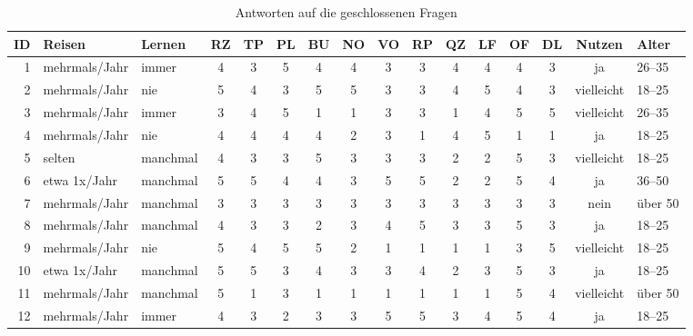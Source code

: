 \documentclass[12pt,a4paper]{scrreprt}
\begin{document}
\begin{table}[!htb]
    \centering
    \footnotesize
    \setlength{\tabcolsep}{3.5pt}
    \begin{tabular}{rllccccccccccccl}
        \toprule
        ID & Reisen & Lernen & RZ & TP & PL & BU & NO & VO & RP & QZ & LF & OF & DL & Nutzen & Alter \\
        \midrule
        1 & mehrmals/Jahr & immer & 4 & 3 & 5 & 4 & 4 & 3 & 3 & 4 & 4 & 4 & 3 & ja & 26--35 \\
        2 & mehrmals/Jahr & nie & 5 & 4 & 3 & 5 & 5 & 3 & 3 & 4 & 5 & 4 & 3 & vielleicht & 18--25 \\
        3 & mehrmals/Jahr & immer & 3 & 4 & 5 & 1 & 1 & 3 & 3 & 1 & 4 & 5 & 5 & vielleicht & 26--35 \\
        4 & mehrmals/Jahr & nie & 4 & 4 & 4 & 4 & 2 & 3 & 1 & 4 & 5 & 1 & 1 & ja & 18--25 \\
        5 & selten & manchmal & 4 & 3 & 3 & 5 & 3 & 3 & 3 & 2 & 2 & 5 & 3 & vielleicht & 18--25 \\
        6 & etwa 1x/Jahr & manchmal & 5 & 5 & 4 & 4 & 3 & 5 & 5 & 2 & 2 & 5 & 4 & ja & 36--50 \\
        7 & mehrmals/Jahr & manchmal & 3 & 3 & 3 & 3 & 3 & 3 & 3 & 3 & 3 & 3 & 3 & nein & über 50 \\
        8 & mehrmals/Jahr & manchmal & 4 & 3 & 3 & 2 & 3 & 4 & 5 & 3 & 3 & 5 & 3 & ja & 18--25 \\
        9 & mehrmals/Jahr & nie & 5 & 4 & 5 & 5 & 2 & 1 & 1 & 1 & 1 & 3 & 5 & vielleicht & 18--25 \\
        10 & etwa 1x/Jahr & manchmal & 5 & 5 & 3 & 4 & 3 & 3 & 4 & 2 & 3 & 5 & 3 & ja & 18--25 \\
        11 & mehrmals/Jahr & manchmal & 5 & 1 & 3 & 1 & 1 & 1 & 1 & 1 & 1 & 5 & 4 & vielleicht & über 50 \\
        12 & mehrmals/Jahr & immer & 4 & 3 & 2 & 3 & 3 & 5 & 5 & 3 & 4 & 5 & 4 & ja & 18--25 \\
        \bottomrule
    \end{tabular}
    \caption{Antworten auf die geschlossenen Fragen}
    \label{tab:rohdaten}
\end{table}
\end{document}
